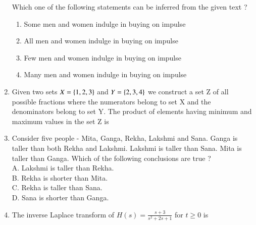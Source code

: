 \documentclass[journal]{IEEEtran}
\begin{document}
\begin{enumerate}
		Which one of the following statements can be inferred from the given text ?
		\begin{enumerate}
			\item Some men and women indulge in buying on impulse
			\item All men and women indulge in buying on impulse
			\item Few men and women indulge in buying on impulse
			\item Many men and women indulge in buying on impulse
		\end{enumerate}
	\item Given two sets $X = \left\{1,2,3\right\}$ and $Y = \left\{2,3,4\right\}$ we construct a set Z of all possible fractions where the numerators belong to set X and the denominators belong to set Y. The product of elements having minimum and maximum values in the set Z is
		\begin{enumerate}
		\end{enumerate}
	\item Consider five people - Mita, Ganga, Rekha, Lakshmi and Sana. Ganga is taller than both Rekha and Lakshmi. Lakshmi is taller than Sana. Mita is taller than Ganga. Which of the following conclusions are true ? \\
		A. Lakshmi is taller than Rekha. \\
		B. Rekha is shorter than Mita. \\
		C. Rekha is taller than Sana. \\
		D. Sana is shorter than Ganga.
		\begin{enumerate}
				\begin{multicols}{2}
				\item 1 and 3
				\item 3 only
				\item 2 and 4
				\item 1 only
				\end{multicols}
		\end{enumerate}
	\item The inverse Laplace transform of $H(s) = \frac{s+3}{s^2 + 2s + 1}$ for $t \geq 0$ is
		\begin{enumerate}

\end{enumerate}
\end{enumerate}
\end{document}
